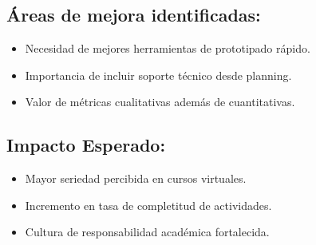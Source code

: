 \subsection{Áreas de mejora identificadas:}
\begin{itemize}
    \item Necesidad de mejores herramientas de prototipado rápido.
    \item Importancia de incluir soporte técnico desde planning.
    \item Valor de métricas cualitativas además de cuantitativas.
\end{itemize}

\subsection{Impacto Esperado:}
\begin{itemize}
    \item Mayor seriedad percibida en cursos virtuales.
    \item Incremento en tasa de completitud de actividades.
    \item Cultura de responsabilidad académica fortalecida.
\end{itemize}
